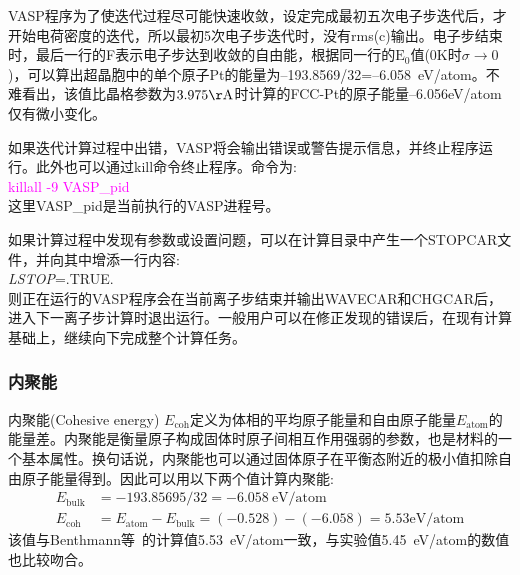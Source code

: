 \textrm{VASP}程序为了使迭代过程尽可能快速收敛，设定完成最初五次电子步迭代后，才开始电荷密度的迭代，所以最初5次电子步迭代时，没有\textrm{rms(c)}输出。电子步结束时，最后一行的\textrm{F}表示电子步达到收敛的自由能，根据同一行的$\mathrm{E}_0$值(0\textrm{K}时$\sigma\rightarrow0$)，可以算出超晶胞中的单个原子\textrm{Pt}的能量为--193.8569/32=--6.058\textrm{~eV/atom}。不难看出，该值比晶格参数为$3.975\mathrm{\AA}$时计算的\textrm{FCC-Pt}的原子能量--6.056\textrm{eV/atom}仅有微小变化。

如果迭代计算过程中出错，\textrm{VASP}将会输出错误或警告提示信息，并终止程序运行。此外也可以通过\textrm{kill}命令终止程序。命令为:~\\
\textcolor{magenta}{\textrm{killall -9 VASP\_pid}}\\
这里\textrm{VASP\_pid}是当前执行的\textrm{VASP}进程号。

如果计算过程中发现有参数或设置问题，可以在计算目录中产生一个\textrm{STOPCAR}文件，并向其中增添一行内容:~\\
\textit{LSTOP}=\textrm{.TRUE.}\\
则正在运行的\textrm{VASP}程序会在当前离子步结束并输出\textrm{WAVECAR}和\textrm{CHGCAR}后，进入下一离子步计算时退出运行。一般用户可以在修正发现的错误后，在现有计算基础上，继续向下完成整个计算任务。

\subsubsection{内聚能}
内聚能\textrm{(Cohesive energy) $E_{\mathrm{coh}}$}定义为体相的平均原子能量和自由原子能量$E_{\mathrm{atom}}$的能量差。内聚能是衡量原子构成固体时原子间相互作用强弱的参数，也是材料的一个基本属性。换句话说，内聚能也可以通过固体原子在平衡态附近的极小值扣除自由原子能量得到。因此可以用以下两个值计算内聚能:~
\begin{displaymath}
	\begin{aligned}
		E_{\mathrm{bulk}}&=-193.85695/32=-6.058~\mathrm{eV/atom}\\
		E_{\mathrm{coh}}&=E_{\mathrm{atom}}-E_{\mathrm{bulk}}=(-0.528)-(-6.058)=5.53\mathrm{eV/atom}
	\end{aligned}
\end{displaymath}
该值与\textrm{Benthmann等}~的计算值5.53\textrm{~eV/atom}\cite{PRB78-205302_2008}一致，与实验值5.45\textrm{~eV/atom}\cite{Landolt-Bornstein}的数值也比较吻合。
